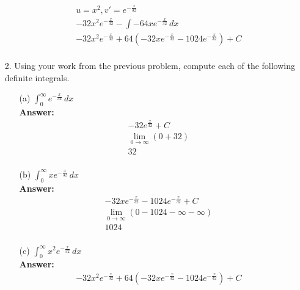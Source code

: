 \documentclass[a4paper]{article}
\begin{document}
\begin{itemize}
\begin{itemize}
\begin{equation}
\begin{split}
	      	      		u = x^{2}, v' = e^{-\frac{x}{32}} \\
	      	      		-32x^{2}e^{-\frac{x}{32}} - \int -64xe^{-\frac{x}{32}} \,dx \\
	      	      		-32x^{2}e^{-\frac{x}{32}} + 64(-32xe^{-\frac{x}{32}} - 1024e^{-\frac{x}{32}}) + C \\
	      	      	\end{split}
	      	      \end{equation}
	      \end{itemize} 
	\item[2.] Using your work from the previous problem, compute each of the following definite integrals.
	      \begin{itemize}
	      	\item[(a)] $\int_{0}^{\infty} e^{-\frac{x}{32}} \,dx$ \\
	      	      \textbf{Answer:} 
	      	      \begin{equation}
	      	      	\begin{split}
	      	      		-32 e^{\frac{x}{32}} + C \\
	      	      		\lim_{0\to\infty} (0 + 32) \\
	      	      		32 \\
	      	      	\end{split}
	      	      \end{equation}
	      	\item[(b)] $\int_{0}^{\infty} xe^{-\frac{x}{32}} \,dx$ \\
	      	      \textbf{Answer:} 
	      	      \begin{equation}
	      	      	\begin{split}
	      	      		-32xe^{-\frac{x}{32}} - 1024e^{-\frac{x}{32}} + C \\
	      	      		\lim_{0\to\infty} (0 - 1024 - \infty - \infty) \\
	      	      		1024 \\
	      	      	\end{split}
	      	      \end{equation}
	      	\item[(c)] $\int_{0}^{\infty} x^{2}e^{-\frac{x}{32}} \,dx$ \\
	      	      \textbf{Answer:} 
	      	      \begin{equation}
	      	      	\begin{split}
	      	      		-32x^{2}e^{-\frac{x}{32}} + 64(-32xe^{-\frac{x}{32}} - 1024e^{-\frac{x}{32}}) + C \\

\end{split}
\end{equation}
\end{itemize}
\end{itemize}
\end{document}
